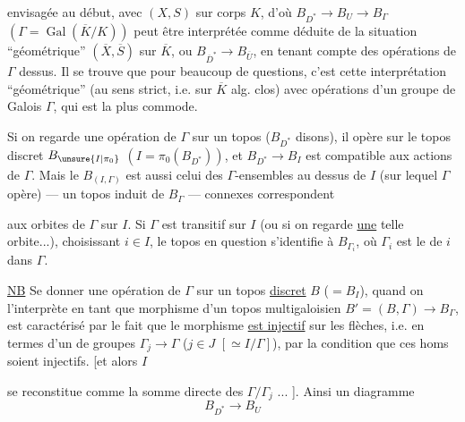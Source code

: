 
 envisagée au début, avec $(X,S)$ sur corps $K$,
d'où  $B_{D^*}\longrightarrow B_U\longrightarrow B_\Gamma$
$(\Gamma=\operatorname{Gal}(\overline K/K))$
peut être interprétée comme déduite
de la situation ``géométrique'' $(\overline X,\overline S)$ sur $\overline K$,
ou $B_{\overline D^*}\longrightarrow B_{\overline U}$, en tenant compte
des opérations de $\Gamma$ dessus. Il se trouve
que pour beaucoup de questions, c'est
cette interprétation ``géométrique'' (au
sens strict, i.e. sur $\overline K$ alg. clos) avec
opérations d'un groupe de Galois $\Gamma$, qui
est la plus commode.

Si on regarde une opération de $\Gamma$
sur un topos ($B_{D^*}$ disons),
il opère sur le topos discret $B_{\unsure{I|\pi_0}}$
$(I=\pi_0(B_{D^*}))$, et $B_{D^*}\longrightarrow B_I$ est
compatible aux actions de $\Gamma$. 
Mais le   $B_{(I,\Gamma)}$ est aussi
celui des $\Gamma$-ensembles au dessus de
$I$ (sur lequel $\Gamma$ opère) --- un topos induit
de $B_\Gamma$ ---  
connexes correspondent


aux orbites de $\Gamma$ sur $I$. Si $\Gamma$ est
transitif sur $I$  (ou si on regarde \uline{une}
telle orbite...), choisissant $i\in I$, le topos
en question s'identifie à $B_{\Gamma_i}$, où $\Gamma_i$
est le  de  $i$ dans $\Gamma$.

\uline{NB} Se donner une opération de $\Gamma$
sur un topos \uline{discret} $B$ ($=B_I$),
quand on l'interprète en tant
que morphisme d'un topos
multigaloisien $B'=(B,\Gamma)\longrightarrow B_\Gamma$,
est caractérisé par le fait que
le morphisme 
\uline{est injectif} sur les
flèches, i.e. en termes d'un 
 de groupes $\Gamma_j\longrightarrow\Gamma$ ($j\in J$
$[\simeq I/\Gamma]$), par la condition que ces
homs soient injectifs. [et alors $I$

se reconstitue comme la somme
directe des $\Gamma/\Gamma_j$ ... ]. Ainsi un
diagramme
\[
 B_{D^*}\longrightarrow B_U
\]

